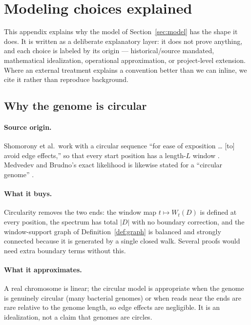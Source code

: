 \section{Modeling choices explained}
\label{app:modeling}

This appendix explains why the model of Section~\ref{sec:model} has the shape it
does. It is written as a deliberate explanatory layer: it does not prove
anything, and each choice is labeled by its origin --- historical/source
mandated, mathematical idealization, operational approximation, or
project-level extension. Where an external treatment explains a convention
better than we can inline, we cite it rather than reproduce background.

\subsection{Why the genome is circular}

\paragraph{Source origin.}
Shomorony et al.\ work with a circular sequence ``for ease of exposition \dots
[to] avoid edge effects,'' so that every start position has a length-$L$ window
\parencite[\S2]{shomorony2016}. Medvedev and Brudno's exact likelihood is likewise
stated for a ``circular genome'' \parencite[\S6.1]{medvedev2009}.

\paragraph{What it buys.}
Circularity removes the two ends: the window map $t\mapsto W_t(D)$ is defined at
every position, the spectrum has total $|D|$ with no boundary correction, and the
window-support graph of Definition~\ref{def:graph} is balanced and strongly
connected because it is generated by a single closed walk. Several proofs would
need extra boundary terms without this.

\paragraph{What it approximates.}
A real chromosome is linear; the circular model is appropriate when the genome is
genuinely circular (many bacterial genomes) or when reads near the ends are rare
relative to the genome length, so edge effects are negligible. It is an
idealization, not a claim that genomes are circles.

